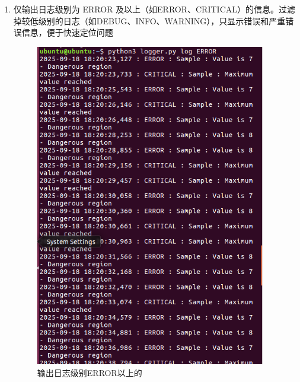 \documentclass[UTF8]{ctexart}
\begin{document}
\begin{enumerate}
    
    \item 仅输出日志级别为 ERROR 及以上（如ERROR、CRITICAL）的信息。过滤掉较低级别的日志（如DEBUG、INFO、WARNING），只显示错误和严重错误信息，便于快速定位问题
    \begin{figure}[H]
    \centering
    \includegraphics[width=0.95\textwidth]{picture/3.png}
    \caption{输出日志级别ERROR以上的}
\end{figure}
    

\end{enumerate}
\end{document}
